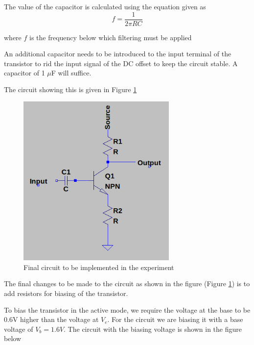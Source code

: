 \documentclass[12pt, a4paper]{article}
\begin{document}
 	The value of the capacitor is calculated using the equation given as 
 	\begin{equation}
 	 	f = \frac{1}{2\pi RC}
 	\end{equation}

 	where $f$ is the frequency below which filtering must be applied

 	An additional capacitor needs to be introduced to the input terminal of the transistor to rid the input signal of the DC offset to keep the circuit stable. A capacitor of 1 $\mu$F will suffice. 

 	The circuit showing this is given in Figure \ref{fig:final_transistor_circuit}

 	\begin{figure}[H]
 		\centering
		\label{fig:final_transistor_circuit}
		\includegraphics[width=0.7\textwidth]{images/final_transistor_circuit.png}
		\caption{Final circuit to be implemented in the experiment}
 	\end{figure}

 	The final changes to be made to the circuit as shown in the figure (Figure \ref{fig:final_transistor_circuit}) is to add resistors for biasing of the transistor.

 	To bias the transistor in the active mode, we require the voltage at the base to be 0.6V higher than the voltage at $V_e$. For the circuit we are biasing it with a base voltage of $V_b = 1.6V$. The circuit with the biasing voltage is shown in the figure below 
\end{document}
